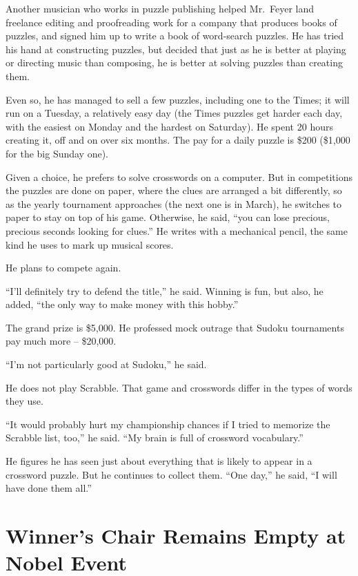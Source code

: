 ﻿\documentclass[12pt]{article}
\begin{document}
Another musician who works in puzzle publishing helped Mr.~Feyer land freelance editing and
proofreading work for a company that produces books of puzzles, and signed him up to write a book of
word-search puzzles. He has tried his hand at constructing puzzles, but decided that just as he is
better at playing or directing music than composing, he is better at solving puzzles than creating
them.

Even so, he has managed to sell a few puzzles, including one to the Times; it will run on a Tuesday,
a relatively easy day (the Times puzzles get harder each day, with the easiest on Monday and the
hardest on Saturday). He spent 20 hours creating it, off and on over six months. The pay for a daily
puzzle is \$200 (\$1,000 for the big Sunday one).

Given a choice, he prefers to solve crosswords on a computer. But in competitions the puzzles are
done on paper, where the clues are arranged a bit differently, so as the yearly tournament
approaches (the next one is in March), he switches to paper to stay on top of his game. Otherwise,
he said, ``you can lose precious, precious seconds looking for clues.'' He writes with a mechanical
pencil, the same kind he uses to mark up musical scores.

He plans to compete again.

``I'll definitely try to defend the title,'' he said. Winning is fun, but also, he added, ``the only
way to make money with this hobby.''

The grand prize is \$5,000. He professed mock outrage that Sudoku tournaments pay much more --
\$20,000.

``I'm not particularly good at Sudoku,'' he said.

He does not play Scrabble. That game and crosswords differ in the types of words they use.

``It would probably hurt my championship chances if I tried to memorize the Scrabble list, too,'' he
said. ``My brain is full of crossword vocabulary.''

He figures he has seen just about everything that is likely to appear in a crossword puzzle. But he
continues to collect them. ``One day,'' he said, ``I will have done them all.''

\section{Winner's Chair Remains Empty at Nobel Event}
\end{document}
